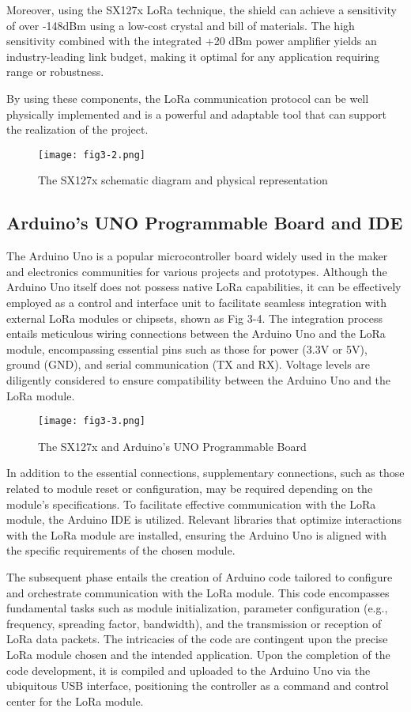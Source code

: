 Moreover, using the SX127x LoRa technique, the shield can achieve a sensitivity of over -148dBm using a low-cost crystal and bill of materials. The high sensitivity combined with the integrated +20 dBm power amplifier yields an industry-leading link budget, making it optimal for any application requiring range or robustness.

By using these components, the LoRa communication protocol can be well physically implemented and is a powerful and adaptable tool that can support the realization of the project.
\begin{figure}
  \centering
  \texttt{[image: fig3-2.png]}
  \caption{The SX127x schematic diagram and physical representation}
  \label{fig:3-2}
\end{figure}

\subsection{Arduino’s UNO Programmable Board and IDE}
The Arduino Uno is a popular microcontroller board widely used in the maker and electronics communities for various projects and prototypes. Although the Arduino Uno itself does not possess native LoRa capabilities, it can be effectively employed as a control and interface unit to facilitate seamless integration with external LoRa modules or chipsets, shown as Fig 3-4. The integration process entails meticulous wiring connections between the Arduino Uno and the LoRa module, encompassing essential pins such as those for power (3.3V or 5V), ground (GND), and serial communication (TX and RX). Voltage levels are diligently considered to ensure compatibility between the Arduino Uno and the LoRa module. 
\begin{figure}
  \centering
  \texttt{[image: fig3-3.png]}
  \caption{The SX127x and Arduino’s UNO Programmable Board}
  \label{fig:3-3}
\end{figure}
In addition to the essential connections, supplementary connections, such as those related to module reset or configuration, may be required depending on the module's specifications. To facilitate effective communication with the LoRa module, the Arduino IDE is utilized. Relevant libraries that optimize interactions with the LoRa module are installed, ensuring the Arduino Uno is aligned with the specific requirements of the chosen module.

The subsequent phase entails the creation of Arduino code tailored to configure and orchestrate communication with the LoRa module. This code encompasses fundamental tasks such as module initialization, parameter configuration (e.g., frequency, spreading factor, bandwidth), and the transmission or reception of LoRa data packets. The intricacies of the code are contingent upon the precise LoRa module chosen and the intended application. Upon the completion of the code development, it is compiled and uploaded to the Arduino Uno via the ubiquitous USB interface, positioning the controller as a command and control center for the LoRa module.

